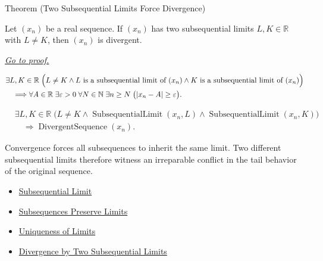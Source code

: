 
\begin{theorembox}{Theorem (Two Subsequential Limits Force Divergence)}
\begin{theorem}
\label{thm:two-subsequential-limits-force-divergence}
Let $(x_n)$ be a real sequence. If $(x_n)$ has two subsequential limits
$L,K\in\mathbb{R}$ with $L\ne K$, then $(x_n)$ is divergent.

\smallskip
\noindent
\hyperref[prf:two-subsequential-limits-force-divergence]{\textit{Go to proof.}}
\end{theorem}
\end{theorembox}

\begin{remark*}
\[
\begin{aligned}
&\exists L,K\in\mathbb{R}\;
\Bigl(
  L\ne K
  \land
  L\text{ is a subsequential limit of }(x_n)
  \land
  K\text{ is a subsequential limit of }(x_n)
\Bigr)\\
&\quad\Longrightarrow
\forall A\in\mathbb{R}\;\exists \varepsilon>0\;\forall N\in\mathbb{N}
\;\exists n\ge N\;\bigl(|x_n-A|\ge\varepsilon\bigr).
\end{aligned}
\]
\end{remark*}

\begin{remark*}
\[
\begin{aligned}
&\exists L,K\in\mathbb{R}\;
\bigl(
  L\ne K
  \land \operatorname{SubsequentialLimit}(x_n,L)
  \land \operatorname{SubsequentialLimit}(x_n,K)
\bigr)\\
&\quad\Longrightarrow
\operatorname{DivergentSequence}(x_n).
\end{aligned}
\]
\end{remark*}

\begin{remark*}[Interpretation]
Convergence forces all subsequences to inherit the same limit. Two different
subsequential limits therefore witness an irreparable conflict in the tail
behavior of the original sequence.
\end{remark*}

\begin{remark*}[Dependencies]\hfill
\begin{itemize}
  \item \hyperref[def:subsequential-limit]{Subsequential Limit}
  \item \hyperref[thm:subsequences-preserve-limits]{Subsequences Preserve Limits}
  \item \hyperref[thm:uniqueness-of-limits]{Uniqueness of Limits}
  \item \hyperref[thm:divergence-by-two-subsequential-limits]{Divergence by Two Subsequential Limits}
\end{itemize}
\end{remark*}

